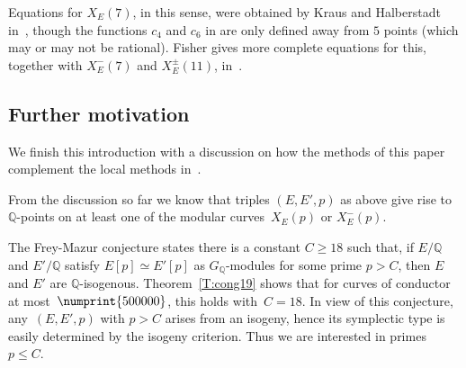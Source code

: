 \documentclass[12pt, reqno]{amsart}
\newcommand{\Q}{\mathbb{Q}}
\numberwithin{equation}{section}
\theoremstyle{definition}
\theoremstyle{remark}
\begin{document}
Equations for $X_E(7)$, in this sense, were obtained by Kraus and
Halberstadt in~\cite{Halberstadt-Kraus-XE7}, though the functions
$c_4$ and $c_6$ in \cite{Halberstadt-Kraus-XE7} are only defined away
from $5$ points (which may or may not be rational). Fisher gives more
complete equations for this, together with $X_E^-(7)$ and
$X_E^{\pm}(11)$, in~\cite{Fisher}.



\subsection{Further motivation} \label{S:motivation}
We finish this introduction with a discussion on how the methods of
this paper complement the local methods in~\cite{FKSym}.

From the discussion so far we know that triples $(E,E',p)$ as above give rise to $\Q$-points on at least one of the modular curves~$X_E(p)$ or $X_E^-(p)$. 

The Frey-Mazur conjecture states there is a constant $C \geq 18$ such
that, if $E/\Q$ and $E'/\Q$ satisfy $E[p] \simeq E'[p]$ as
$G_\Q$-modules for some prime $p > C$, then $E$ and $E'$ are
$\Q$-isogenous. Theorem~\ref{T:cong19} shows that for curves of
conductor at most~$\numprint{500000}$, this holds with~$C=18$. In view
of this conjecture, any~$(E,E',p)$ with $p > C$ arises from an
isogeny, hence its symplectic type is easily determined by the isogeny
criterion. Thus we are interested in primes $p \leq C$.

\end{document}

